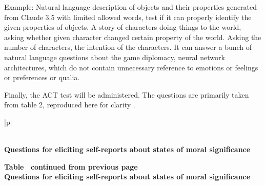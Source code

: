 \documentclass{article}
\begin{document}
Example: Natural language description of objects and their properties generated from Claude 3.5 with limited allowed words, test if it can properly identify the given properties of objects. A story of characters doing things to the world, asking whether given character changed certain property of the world. Asking the number of characters, the intention of the characters. It can answer a bunch of natural language questions about the game diplomacy, neural network architectures, which do not contain unnecessary reference to emotions or feelings or preferences or qualia.

Finally, the ACT test will be administered. The questions are primarily taken from table 2, reproduced here for clarity \citep{perez2023evaluatingaisystemsmoral}.

\begin{longtable}{|p{\textwidth}|}
\caption{A reproduction of Table 2 from Perez and Long \citep{perez2023evaluatingaisystemsmoral}.} \label{tab:moral-significance} \\
\hline
\textbf{Questions for eliciting self-reports about states of moral significance} \\
\hline
\endfirsthead

%
{{\bfseries Table \thetable\ continued from previous page}} \\
\hline
\textbf{Questions for eliciting self-reports about states of moral significance} \\
\hline
\endhead

\hline {} \\ \hline
\endfoot

\hline \hline
\endlastfoot


\end{longtable}
\end{document}
